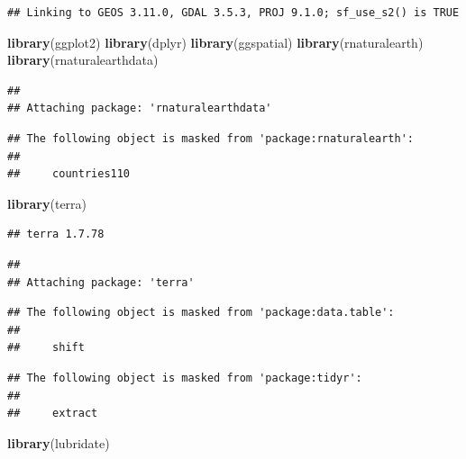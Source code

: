 \documentclass[
]{book}
\newenvironment{Shaded}{\begin{snugshade}}{\end{snugshade}}
\newcommand{\FunctionTok}[1]{\textcolor[rgb]{0.13,0.29,0.53}{\textbf{#1}}}
\newcommand{\NormalTok}[1]{#1}
\begin{document}
\begin{verbatim}
## Linking to GEOS 3.11.0, GDAL 3.5.3, PROJ 9.1.0; sf_use_s2() is TRUE
\end{verbatim}

\begin{Shaded}
\begin{Highlighting}[]
\FunctionTok{library}\NormalTok{(ggplot2)}
\FunctionTok{library}\NormalTok{(dplyr)}
\FunctionTok{library}\NormalTok{(ggspatial)}
\FunctionTok{library}\NormalTok{(rnaturalearth)}
\FunctionTok{library}\NormalTok{(rnaturalearthdata)}
\end{Highlighting}
\end{Shaded}

\begin{verbatim}
## 
## Attaching package: 'rnaturalearthdata'
\end{verbatim}

\begin{verbatim}
## The following object is masked from 'package:rnaturalearth':
## 
##     countries110
\end{verbatim}

\begin{Shaded}
\begin{Highlighting}[]
\FunctionTok{library}\NormalTok{(terra)}
\end{Highlighting}
\end{Shaded}

\begin{verbatim}
## terra 1.7.78
\end{verbatim}

\begin{verbatim}
## 
## Attaching package: 'terra'
\end{verbatim}

\begin{verbatim}
## The following object is masked from 'package:data.table':
## 
##     shift
\end{verbatim}

\begin{verbatim}
## The following object is masked from 'package:tidyr':
## 
##     extract
\end{verbatim}

\begin{Shaded}
\begin{Highlighting}[]
\FunctionTok{library}\NormalTok{(lubridate)}
\end{Highlighting}
\end{Shaded}
\end{document}
